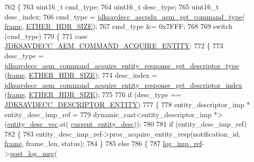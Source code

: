 \begin{DoxyCode}
762 \{
763     uint16\_t cmd\_type;
764     uint16\_t desc\_type;
765     uint16\_t desc\_index;
766     cmd\_type = \hyperlink{group__aecpdu__aem_ga61a282324f09f449059b9fe710363710}{jdksavdecc\_aecpdu\_aem\_get\_command\_type}(
      \hyperlink{gst__avb__playbin_8c_ac8e710e0b5e994c0545d75d69868c6f0}{frame}, \hyperlink{namespaceavdecc__lib_a6c827b1a0d973e18119c5e3da518e65ca9512ad9b34302ba7048d88197e0a2dc0}{ETHER\_HDR\_SIZE});
767     cmd\_type &= 0x7FFF;
768 
769     \textcolor{keywordflow}{switch} (cmd\_type)
770     \{
771     \textcolor{keywordflow}{case} \hyperlink{group__command_ga74ebee0a0531409bb10f7ce9e1216c04}{JDKSAVDECC\_AEM\_COMMAND\_ACQUIRE\_ENTITY}:
772     \{
773         desc\_type = 
      \hyperlink{group__command__acquire__entity__response_ga89a79f0364a5e4c2487f48fe4cf53dd2}{jdksavdecc\_aem\_command\_acquire\_entity\_response\_get\_descriptor\_type}
      (\hyperlink{gst__avb__playbin_8c_ac8e710e0b5e994c0545d75d69868c6f0}{frame}, \hyperlink{namespaceavdecc__lib_a6c827b1a0d973e18119c5e3da518e65ca9512ad9b34302ba7048d88197e0a2dc0}{ETHER\_HDR\_SIZE});
774         desc\_index = 
      \hyperlink{group__command__acquire__entity__response_ga250a3521fec9da2e6b8dd42cb3efdef8}{jdksavdecc\_aem\_command\_acquire\_entity\_response\_get\_descriptor\_index}
      (\hyperlink{gst__avb__playbin_8c_ac8e710e0b5e994c0545d75d69868c6f0}{frame}, \hyperlink{namespaceavdecc__lib_a6c827b1a0d973e18119c5e3da518e65ca9512ad9b34302ba7048d88197e0a2dc0}{ETHER\_HDR\_SIZE});
775 
776         \textcolor{keywordflow}{if} (desc\_type == \hyperlink{group__descriptor_gaf06b7a0bf808dc8e3104511947d694c4}{JDKSAVDECC\_DESCRIPTOR\_ENTITY})
777         \{
778             entity\_descriptor\_imp * entity\_desc\_imp\_ref =
779                 \textcolor{keyword}{dynamic\_cast<}entity\_descriptor\_imp *\textcolor{keyword}{>}(\hyperlink{classavdecc__lib_1_1end__station__imp_a72edab41bc56e3c1757944a7df188a3d}{entity\_desc\_vec}.at(
      \hyperlink{classavdecc__lib_1_1end__station__imp_afd78c89df26ba7641e1adb764c0e827d}{current\_entity\_desc}));
780 
781             \textcolor{keywordflow}{if} (entity\_desc\_imp\_ref)
782             \{
783                 entity\_desc\_imp\_ref->proc\_acquire\_entity\_resp(notification\_id, 
      \hyperlink{gst__avb__playbin_8c_ac8e710e0b5e994c0545d75d69868c6f0}{frame}, frame\_len, status);
784             \}
785             \textcolor{keywordflow}{else}
786             \{
787                 \hyperlink{namespaceavdecc__lib_acbe3e2a96ae6524943ca532c87a28529}{log\_imp\_ref}->\hyperlink{classavdecc__lib_1_1log_a68139a6297697e4ccebf36ccfd02e44a}{post\_log\_msg}(

\end{DoxyCode}
